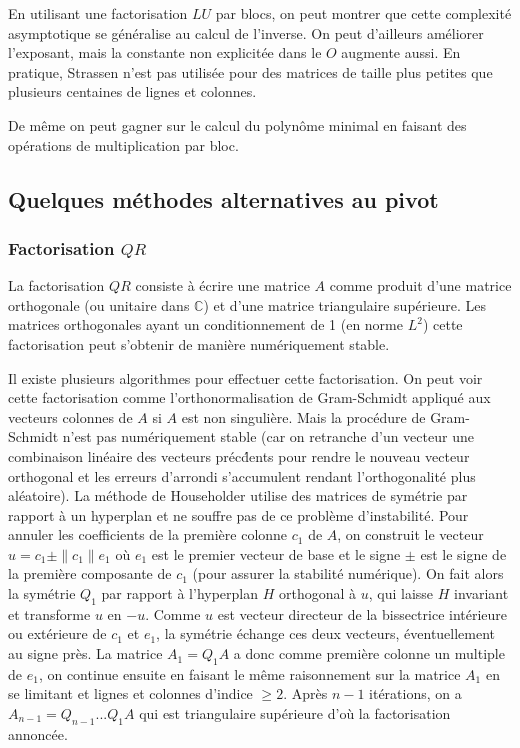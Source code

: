 \documentclass[a4paper,11pt]{article}
\begin{document}
\begin{giacjshere}
En utilisant une factorisation $LU$ par blocs, on peut montrer
que cette complexit\'e asymptotique se g\'en\'eralise au
calcul de l'inverse. On peut d'ailleurs am\'eliorer l'exposant,
mais la constante non explicit\'ee dans le $O$ augmente aussi.
En pratique, Strassen n'est pas utilis\'ee pour des matrices
de taille plus petites que plusieurs centaines de lignes et colonnes.

De m\^eme on peut gagner sur le calcul du polyn\^ome minimal en
faisant des op\'erations de multiplication par bloc.

\subsection{Quelques m\'ethodes alternatives au pivot}
\subsubsection{Factorisation $QR$}
La factorisation $QR$ 
consiste à écrire une matrice $A$ comme produit d'une matrice
orthogonale (ou unitaire dans $\mathbb{C}$) et d'une matrice triangulaire
supérieure. Les matrices orthogonales ayant un conditionnement
de 1 (en norme $L^2$) cette factorisation peut s'obtenir de mani\`ere 
numériquement stable.

Il existe plusieurs algorithmes pour effectuer cette factorisation.
On peut voir cette factorisation comme l'orthonormalisation de
Gram-Schmidt appliqu\'e aux vecteurs colonnes de $A$ si $A$ est non 
singuli\`ere. Mais la proc\'edure de Gram-Schmidt n'est pas
num\'eriquement stable (car on retranche d'un vecteur
une combinaison lin\'eaire des vecteurs pr\'ec\'dents pour rendre
le nouveau vecteur orthogonal et les erreurs d'arrondi s'accumulent
rendant l'orthogonalit\'e plus al\'eatoire).
La m\'ethode de Householder utilise des matrices de sym\'etrie
par rapport \`a un hyperplan et ne souffre pas de ce probl\`eme d'instabilit\'e.
Pour annuler les coefficients de la premi\`ere colonne $c_1$ de $A$,
on construit le vecteur $u=c_1 \pm \|c_1\| e_1$ o\`u $e_1$
est le premier vecteur de base et le signe $\pm$ est
le signe de la premi\`ere composante de $c_1$ (pour assurer
la stabilit\'e num\'erique). On fait alors la sym\'etrie $Q_1$ par rapport
\`a l'hyperplan $H$ orthogonal \`a $u$, qui laisse $H$ invariant
et transforme $u$ en $-u$. Comme $u$ est vecteur directeur
de la bissectrice int\'erieure ou ext\'erieure de $c_1$ et $e_1$, la sym\'etrie
\'echange ces deux vecteurs, \'eventuellement au signe pr\`es.
La matrice $A_1=Q_1A$ a donc comme premi\`ere colonne un multiple de
$e_1$, on continue ensuite en faisant le m\^eme raisonnement
sur la matrice $A_1$ en se limitant et lignes et colonnes d'indice
$\geq 2$. Apr\`es $n-1$ it\'erations, on a $A_{n-1}=Q_{n-1}...Q_1A$
qui est triangulaire sup\'erieure d'o\`u la factorisation annonc\'ee.


\end{giacjshere}
\end{document}
